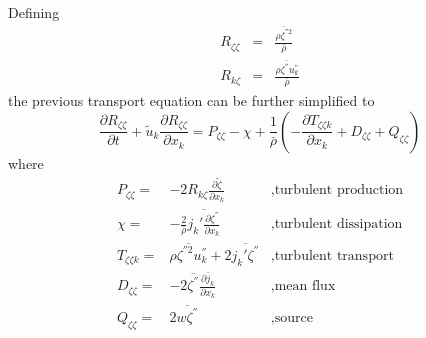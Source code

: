 Defining
\begin{eqnarray}
  R_{\zeta\zeta} & = & \frac{\overline{\rho \zeta^{''2}}}{\bar{\rho}} \\
  R_{k \zeta} & = & \frac{\overline{\rho \zeta^{''} u^{''}_k}}{\bar{\rho}}
\end{eqnarray}
the previous transport equation can be further simplified to
\begin{equation}
  \label{eq:scalar3}
  \frac{\partial R_{\zeta \zeta}}{\partial t} + 
  \tilde{u}_k \frac{\partial R_{\zeta \zeta}}{\partial x_k}
  = P_{\zeta\zeta} - \chi +\frac{1}{\bar{\rho}} \left(
  - \frac{\partial T_{\zeta\zeta k}}{\partial x_k} + D_{\zeta\zeta} + Q_{\zeta\zeta}\right)
\end{equation}
where
\begin{eqnarray*}
  P_{\zeta \zeta} = & -2 R_{k \zeta} \frac{\partial \tilde{\zeta}}{\partial x_k}
  &,\text{turbulent production}\\
  \chi = & -\frac{2}{\bar{\rho}} \overline{j_k' \frac{\partial \zeta^{''}}{\partial x_k}}
  &,\text{turbulent dissipation}\\ 
  T_{\zeta\zeta k} = & \overline{\rho \zeta^{''2} u^{''}_k } +2
  \overline{j_k'\zeta^{''}}
  &,\text{turbulent transport}\\ 
  D_{\zeta\zeta} = & -2 \overline{\zeta^{''}} \frac{\partial \bar{j}_k}{\partial x_k} 
     &,\text{mean flux}\\
  Q_{\zeta\zeta} = & 2\overline{w\zeta^{''}}&,\text{source}
\end{eqnarray*}

